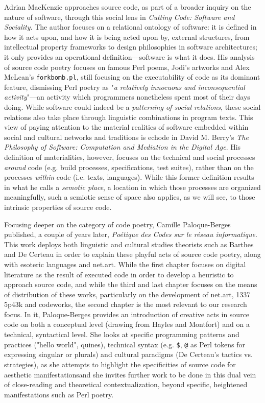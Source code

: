 Adrian MacKenzie approaches source code, as part of a broader inquiry on the nature of software, through this social lens in \emph{Cutting Code: Software and Sociality}\cite{mackenzie_cutting_2006}. The author focuses on a relational ontology of software: it is defined in how it acts upon, and how it is being acted upon by, external structures, from intellectual property frameworks to design philosophies in software architectures; it only provides an operational definition—software is what it does. His analysis of source code poetry focuses on famous Perl poems, Jodi's artworks and Alex McLean's \lstinline{forkbomb.pl}, still focusing on the executability of code as its dominant feature, dismissing Perl poetry as "\emph{a relatively innocuous and inconsequential activity}"\cite{mackenzie_cutting_2006}—an activity which programmers nonetheless spent most of their days doing. While software could indeed be a \emph{patterning of social relations}, these social relations also take place through linguistic combinations in program texts. This view of paying attention to the material realities of software embedded within social and cultural networks and traditions is echode in David M. Berry's \emph{The Philosophy of Software: Computation and Mediation in the Digital Age}. His definition of materialities, however, focuses on the technical and social processes \emph{around} code (e.g. build processes, specifications, test suites), rather than on the processes \emph{within} code (i.e. texts, languages). While this former definition results in what he calls a \emph{semotic place}\cite{berry_philosophy_2011}, a location in which those processes are organized meaningfully, such a semiotic sense of space also applies, as we will see, to those intrinsic properties of source code.

Focusing deeper on the category of code poetry, Camille Paloque-Berges published, a couple of years later, \emph{Poétique des Codes sur le réseau informatique}\cite{paloque-berges_poetique_2009}. This work deploys both linguistic and cultural studies theorists such as Barthes and De Certeau in order to explain these playful acts of source code poetry, along with esoteric languages and net.art. While the first chapter focuses on digital literature as the result of executed code in order to develop a heuristic to approach source code, and while the third and last chapter focuses on the means of distribution of these works, particularly on the development of net.art, 1337 5p43k and codeworks, the second chapter is the most relevant to our research focus. In it, Paloque-Berges provides an introduction of creative acts in source code on both a conceptual level (drawing from Hayles and Montfort) and on a technical, syntactical level. She looks at specific programming patterns and practices ("hello world", quines), technical syntax (e.g. \lstinline{$}, \lstinline{@} as Perl tokens for expressing singular or plurals) and cultural paradigms (De Certeau's tactics vs. strategies), as she attempts to highlight the specificities of source code for aesthetic manifestationsand she invites further work to be done in this dual vein of close-reading and theoretical contextualization, beyond specific, heightened manifestations such as Perl poetry.

